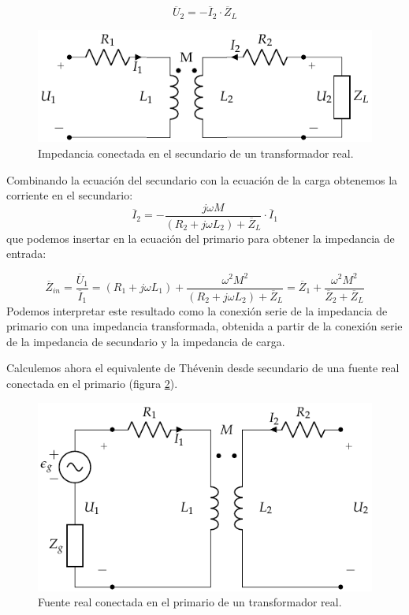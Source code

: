 \begin{equation*}
  \overline{U}_2 = - \overline{I}_2 \cdot \overline{Z}_L
\end{equation*}

\begin{figure}
  \centering
  \includegraphics[height=0.2\textheight]{../figs/Trafo_Real_ImpSec.pdf}
  \caption{Impedancia conectada en el secundario de un transformador real.}
  \label{fig:trafo-real-impedancia-secundario}
\end{figure}


Combinando la ecuación del secundario con la ecuación de la carga obtenemos la corriente en el secundario:
\[
  \overline{I}_2  = - \frac{j \omega M}{(R_2 + j \omega L_2) + \overline{Z}_L} \cdot \overline{I}_1
\]
que podemos insertar en la ecuación del primario para obtener la impedancia de entrada:

\begin{equation}
  \label{eq:trafo-real-impedancia-entrada}
  \overline{Z}_{in}  = \frac{\overline{U}_1}{\overline{I}_1} =  (R_1 + j \omega L_1) + \frac{\omega^2 M^2}{(R_2 + j \omega L_2) + \overline{Z}_L} = \boxed{\overline{Z}_1 + \frac{\omega^2 M^2}{\overline{Z}_2 + \overline{Z}_L}}
\end{equation}
Podemos interpretar este resultado como la conexión serie de la impedancia de primario con una impedancia transformada, obtenida a partir de la conexión serie de la impedancia de secundario y la impedancia de carga.

Calculemos ahora el equivalente de Thévenin desde secundario de una fuente real conectada en el primario (figura \ref{fig:trafo-real-fuente-primario}).

\begin{figure}
  \centering
  \includegraphics[height=0.2\textheight]{../figs/Trafo_Real_FuentePrimario.pdf}
  \caption{Fuente real conectada en el primario de un transformador real.}
  \label{fig:trafo-real-fuente-primario}
\end{figure}

